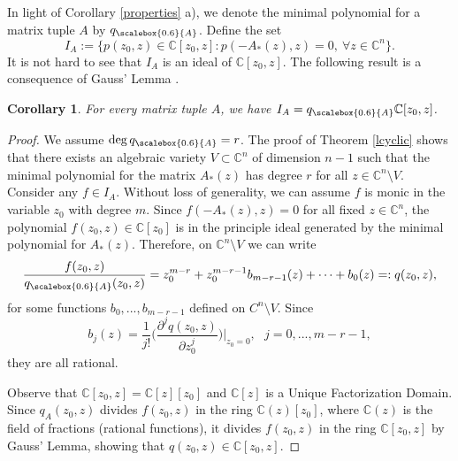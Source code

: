 \documentclass[draft, 12pt, reqno]{amsart}
\newcommand{\C}{{\mathbb C}}
\numberwithin{equation}{section}
\theoremstyle{plain}
\newtheorem{corollary}[theorem]{Corollary}
\begin{document}
In light of Corollary \ref{properties} a), we denote the minimal polynomial for a matrix tuple $A$ by $q_{\scalebox{0.6}{A}}$. Define the set 
\[I_{A}:=\{p(z_0,z)\in \C[z_0,z]: p(-A_*(z),z)=0, \ \forall z\in \C^n\}.\] It is not hard to see that $I_{A}$ is an ideal of $\C[z_0,z]$. The following result is a consequence of Gauss' Lemma \cite[Sect. 11.3]{Ar}.
\begin{corollary}\label{q_A}
For every matrix tuple $A$, we have $I_{A}=q_{\scalebox{0.6}{A}}\C[z_0,z]$.
\end{corollary}

\begin{proof}
We assume $\deg q_{\scalebox{0.6}{A}}=r$. The proof of Theorem \ref{lcyclic} shows that there exists an algebraic variety $V\subset \C^n$ of dimension $n-1$ such that the minimal polynomial for the matrix $A_*(z)$ has degree $r$ for all $z\in \C^n\setminus V$. Consider any $f\in I_A$. Without loss of generality, we can assume $f$ is monic in the variable $z_0$ with degree $m$. Since $f(-A_*(z),z)=0$ for all fixed $z\in \C^n$, the polynomial $f(z_0,z)\in \C[z_0]$ is in the principle ideal generated by the minimal polynomial for $A_*(z)$. Therefore, on $\C^n\setminus V$ we can write 
\[\frac{f(z_0,z)}{q_{\scalebox{0.6}{A}}(z_0,z)}=z_0^{m-r}+z_0^{m-r-1}b_{m-r-1}(z)+\cdots +b_0(z)=:q(z_0,z),\]for some functions $b_0, ..., b_{m-r-1}$ defined on $C^n\setminus V$. Since 
\[b_{j}(z)=\frac{1}{j!}\bigg(\frac{\partial^j q(z_0,z)}{\partial z_0^j}\bigg)\bigg| _{z_0=0},\ \ \ j=0, ..., m-r-1,\] they are all rational.

Observe that $\C[z_0,z]=\C[z][z_0]$ and $\C[z]$ is a Unique Factorization Domain. Since $q_A(z_0, z)$ divides $f(z_0, z)$ in the ring $\mathbb{C}(z)[z_0]$, where $\mathbb{C}(z)$ is the field of fractions (rational functions), it divides $f(z_0, z)$ in the ring $\mathbb{C}[z_0,z]$ by Gauss' Lemma, showing that $q(z_0,z)\in \C[z_0,z]$.
\end{proof}
\end{document}
